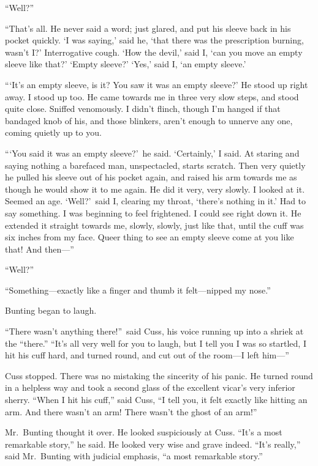 “Well?”

“That’s all. He never said a word; just glared, and put his sleeve back in his pocket quickly. ‘I was saying,’ said he, ‘that there was the prescription burning, wasn’t I?’ Interrogative cough. ‘How the devil,’ said I, ‘can you move an empty sleeve like that?’ ‘Empty sleeve?’ ‘Yes,’ said I, ‘an empty sleeve.’

“\kern1pt‘It’s an empty sleeve, is it? You saw it was an empty sleeve?’ He stood up right away. I stood up too. He came towards me in three very slow steps, and stood quite close. Sniffed venomously. I didn’t flinch, though I’m hanged if that bandaged knob of his, and those blinkers, aren’t enough to unnerve any one, coming quietly up to you.

“\kern1pt‘You said it was an empty sleeve?’\ he said. ‘Certainly,’ I said. At staring and saying nothing a barefaced man, unspectacled, starts scratch. Then very quietly he pulled his sleeve out of his pocket again, and raised his arm towards me as though he would show it to me again. He did it very, very slowly. I looked at it. Seemed an age. ‘Well?’\ said I, clearing my throat, ‘there’s nothing in it.’ Had to say something. I was beginning to feel frightened. I could see right down it. He extended it straight towards me, slowly, slowly, just like that, until the cuff was six inches from my face. Queer thing to see an empty sleeve come at you like that! And then—”

“Well?”

“Something—exactly like a finger and thumb it felt—\linebreak{}nipped my nose.”

Bunting began to laugh.

“There wasn’t anything there!”\ said Cuss, his voice running up into a shriek at the “there.” “It’s all very well for you to laugh, but I tell you I was so startled, I hit his cuff hard, and turned round, and cut out of the room—I left him—”

Cuss stopped. There was no mistaking the sincerity of his panic. He turned round in a helpless way and took a second glass of the excellent vicar’s very inferior sherry. “When I hit his cuff,” said Cuss, “I tell you, it felt exactly like hitting an arm. And there wasn’t an arm! There wasn’t the ghost of an arm!”

Mr.\ Bunting thought it over. He looked suspiciously at Cuss. “It’s a most remarkable story,” he said. He looked very wise and grave indeed. “It’s really,” said Mr.\ Bunting with judicial emphasis, “a most remarkable story.”